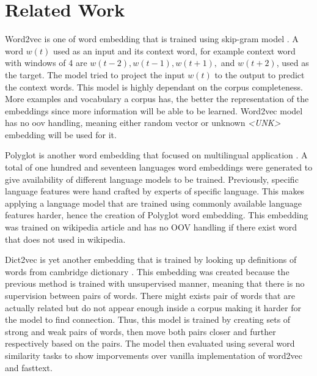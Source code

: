 \chapter{Related Work}
\label{chap:relatedwork}

Word2vec is one of word embedding that is trained using skip-gram
model \citep{efficient2013mikolov}. A word $w(t)$ used as an
input and its context word, for example context word with windows of 4
are $w(t-2), w(t-1), w(t+1),$ and $w(t+2)$, used as the target. The
model tried to project the input $w(t)$ to the output to predict the
context words. This model is highly dependant on the corpus
completeness. More examples and vocabulary a corpus has, the better the
representation of the embeddings since more information will be able
to be learned. Word2vec model has no oov handling, meaning either
random vector or unknown \textit{\textless UNK\textgreater} embedding
will be used for it.

Polyglot is another word embedding that focused on multilingual
application \citep{polyglot2013alrfou}. A total of one hundred and
seventeen languages word embeddings were generated to give
availability of different language models to be trained. Previously,
specific language features were hand crafted by experts of specific
language\citep{polyglot2013alrfou}. This makes applying a language
model that are trained using commonly available language features
harder, hence the creation of Polyglot word embedding. This embedding
was trained on wikipedia article and has no OOV handling if there
exist word that does not used in wikipedia.

Dict2vec is yet another embedding that is trained by looking up
definitions of words from cambridge dictionary
\citep{tissier2017dict2vec}. This embedding was created because the
previous method is trained with unsupervised manner, meaning that
there is no supervision between pairs of words. There might exists
pair of words that are actually related but do not appear enough
inside a corpus making it harder for the model to find connection.
Thus, this model is trained by creating sets of strong and weak pairs of
words, then move both pairs closer and further respectively based on
the pairs. The model then evaluated using several word similarity
tasks to show imporvements over vanilla implementation of word2vec and
fasttext. 

